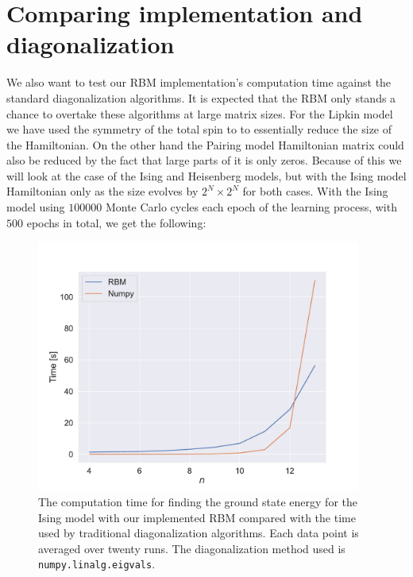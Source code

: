 \section{Comparing implementation and diagonalization}

We also want to test our RBM implementation's computation time against the standard diagonalization algorithms. It is expected that the RBM only stands a chance to overtake these algorithms at large matrix sizes. For the Lipkin model we have used the symmetry of the total spin to to essentially reduce the size of the Hamiltonian. On the other hand the Pairing model Hamiltonian matrix could also be reduced by the fact that large parts of it is only zeros. Because of this we will look at the case of the Ising and Heisenberg models, but with the Ising model Hamiltonian only as the size evolves by $2^N\times 2^N$ for both cases. With the Ising model using $100 000$ Monte Carlo cycles each epoch of the learning process, with $500$ epochs in total, we get the following:

\begin{figure}[H]
  \begin{center}
    \includegraphics[width=0.95\textwidth]{Figures/Plots/Ising/[particles][4-13][e=500][J=0.3][L=-0.4]}
  \end{center}
  \caption{The computation time for finding the ground state energy for the Ising model with our implemented RBM compared with the time used by traditional diagonalization algorithms. Each data point is averaged over twenty runs. The diagonalization method used is \texttt{numpy.linalg.eigvals}.}
\end{figure}

